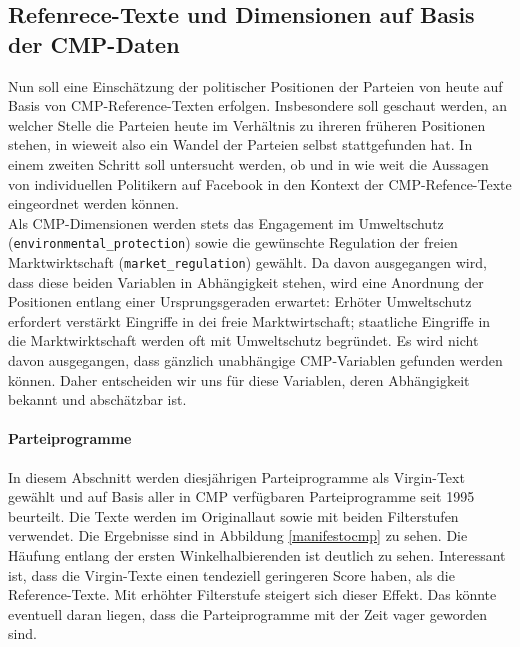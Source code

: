     
    \subsection{Refenrece-Texte und Dimensionen auf Basis der CMP-Daten}
    Nun soll eine Einschätzung der politischer Positionen der Parteien von heute auf Basis von CMP-Reference-Texten erfolgen. Insbesondere soll geschaut werden, an welcher Stelle die Parteien heute im Verhältnis zu ihreren früheren Positionen stehen, in wieweit also ein Wandel der Parteien selbst stattgefunden hat. 
    In einem zweiten Schritt soll untersucht werden, ob und in wie weit die Aussagen von individuellen Politikern auf Facebook in den Kontext der CMP-Refence-Texte eingeordnet werden können. \\
    Als CMP-Dimensionen werden stets das Engagement im Umweltschutz \linebreak (\verb|environmental_protection|) sowie die gewünschte Regulation der freien Marktwirktschaft (\verb|market_regulation|) gewählt. Da davon ausgegangen wird, dass diese beiden Variablen in Abhängigkeit stehen, wird eine Anordnung der Positionen entlang einer Ursprungsgeraden erwartet: Erhöter Umweltschutz erfordert verstärkt Eingriffe in dei freie Marktwirtschaft; staatliche Eingriffe in die Marktwirktschaft werden oft mit Umweltschutz begründet. Es wird nicht davon ausgegangen, dass gänzlich unabhängige CMP-Variablen gefunden werden können. Daher entscheiden wir uns für diese Variablen, deren Abhängigkeit bekannt und abschätzbar ist.
    
    
    \paragraph{Parteiprogramme}
     In diesem Abschnitt werden diesjährigen Parteiprogramme als Virgin-Text gewählt und auf Basis aller in CMP verfügbaren Parteiprogramme seit 1995 beurteilt. Die Texte werden im Originallaut sowie mit beiden Filterstufen verwendet. 
     Die Ergebnisse sind in Abbildung \ref{manifestocmp} zu sehen. Die Häufung entlang der ersten Winkelhalbierenden ist deutlich zu sehen. Interessant ist, dass die Virgin-Texte einen tendeziell geringeren Score haben, als die Reference-Texte. Mit erhöhter Filterstufe steigert sich dieser Effekt. Das könnte eventuell daran liegen, dass die Parteiprogramme mit der Zeit vager geworden sind.
     
